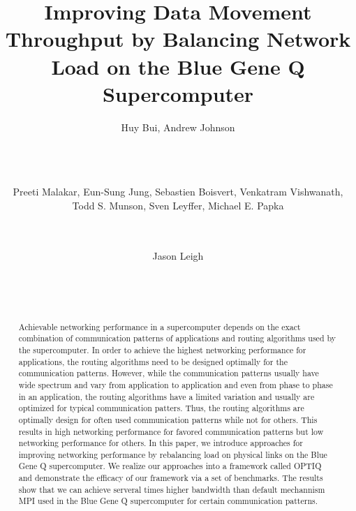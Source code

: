 \documentclass{acm_proc_article-sp}
\begin{document}
\title{Improving Data Movement Throughput by Balancing Network Load on the Blue Gene Q Supercomputer}

\author{
\alignauthor Huy Bui, Andrew Johnson\\
       \\
       \\
       \\
\and  %
\alignauthor Preeti Malakar, Eun-Sung Jung, Sebastien Boisvert, Venkatram Vishwanath, Todd S. Munson, Sven Leyffer, Michael E. Papka\\
       \\
       \\
\and
\alignauthor Jason Leigh\\
       \\
       \\
       \\
}

\maketitle
\begin{abstract}
Achievable networking performance in a supercomputer depends on the exact combination of communication patterns of applications and routing algorithms used by the supercomputer. In order to achieve the highest networking performance for applications, the routing algorithms need to be designed optimally for the communication patterns. However, while the communication patterns usually have wide spectrum and vary from application to application and even from phase to phase in an application, the routing algorithms have a limited variation and usually are optimized for typical communication patters. Thus, the routing algorithms are optimally design for often used communication patterns while not for others. This results in high networking performance for favored communication patterns but low networking performance for others. In this paper, we introduce approaches for improving networking performance by rebalancing load on physical links on the Blue Gene Q supercomputer. We realize our approaches into a framework called OPTIQ and demonstrate the efficacy of our framework via a set of benchmarks. The results show that we can achieve serveral times higher bandwidth than default mechannism MPI used in the Blue Gene Q supercomputer for certain communication patterns.
\end{abstract}
\end{document}
